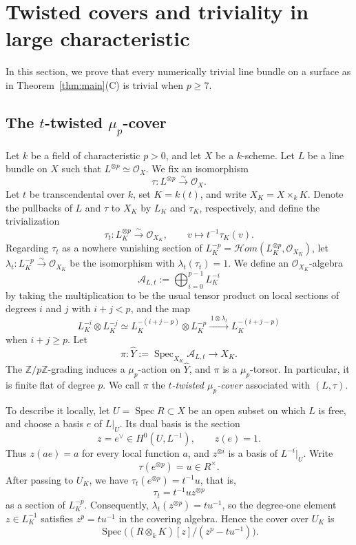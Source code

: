 \documentclass[10pt,abstract=true]{scrartcl}
\numberwithin{equation}{section}
\theoremstyle{definition}
\theoremstyle{remark}
\begin{document}
\section{Twisted covers and triviality in large characteristic}\label{sec:case-C-p-ge7}
In this section, we prove that every numerically trivial line bundle on a surface as in Theorem~\ref{thm:main}\textup{(C)} is trivial when $p\ge7$.

\subsection{The \texorpdfstring{$t$}{t}-twisted \texorpdfstring{$\mu_p$}{mu-p}-cover}\label{sec:generically-twisted-mu-p-cover}
Let $k$ be a field of characteristic $p>0$, and let $X$ be a $k$-scheme.
Let $L$ be a line bundle on $X$ such that $L^{\otimes p}\simeq\mathcal O_X$. We fix an isomorphism
\[
  \tau\colon L^{\otimes p}\xrightarrow{\sim}\mathcal O_X.
\]
Let $t$ be transcendental over $k$, set $K=k(t)$, and write
$X_K=X\times_k K$.  Denote the pullbacks of $L$ and $\tau$ to
$X_K$ by $L_K$ and $\tau_K$, respectively, and define the trivialization
\[
  \tau_t\colon L_K^{\otimes p}\xrightarrow{\sim}\mathcal O_{X_K},\qquad v\longmapsto t^{-1}\tau_K(v).
\]
Regarding $\tau_t$ as a nowhere vanishing section of $L_K^{-p}=\mathcal H\!om(L_K^{\otimes p},\mathcal O_{X_K})$, let $\lambda_t\colon L_K^{-p}\xrightarrow{\sim}\mathcal O_{X_K}$ be the isomorphism with $\lambda_t(\tau_t)=1$.
We define an $\mathcal O_{X_K}$-algebra
\[
  \mathcal A_{L,t}:=\bigoplus_{i=0}^{p-1}L_K^{-i}
\]
by taking the multiplication to be the usual tensor product on local sections of degrees $i$ and $j$ with $i+j<p$, and the map
\[
  L_K^{-i}\otimes L_K^{-j}
    \simeq
  L_K^{-(i+j-p)}\otimes L_K^{-p}
    \xrightarrow{\,1\otimes\lambda_t\,}
  L_K^{-(i+j-p)}
\]
when $i+j\geq p$.
Let
\[
  \pi\colon\widehat Y:=\operatorname{Spec}_{X_K}\mathcal A_{L,t}\longrightarrow X_K.
\]
The $\mathbb Z/p\mathbb Z$-grading induces a $\mu_p$-action on
$\widehat Y$, and $\pi$ is a $\mu_p$-torsor.  In
particular, it is finite flat of degree $p$.
We call $\pi$ the \emph{$t$-twisted $\mu_p$-cover} associated with $(L,\tau)$.

\smallskip
To describe it locally,
let $U=\operatorname{Spec}R\subset X$ be an open subset on which $L$
is free, and choose a basis $e$ of $L|_U$.  Its dual basis is the
section
\[
  z=e^\vee\in H^0(U,L^{-1}),\qquad z(e)=1.
\]
Thus $z(ae)=a$ for every local function $a$, and $z^{\otimes i}$ is a
basis of $L^{-i}|_U$.  Write
\[
  \tau(e^{\otimes p})=u\in R^\times.
\]
After passing to $U_K$, we have $\tau_t(e^{\otimes p})=t^{-1}u$, that is,
\[
  \tau_t=t^{-1}u z^{\otimes p}
\]
as a section of $L_K^{-p}$.
Consequently, $\lambda_t(z^{\otimes p})=tu^{-1}$, so the degree-one
element $z\in L_K^{-1}$ satisfies $z^p=tu^{-1}$ in the covering
algebra.  Hence the cover over $U_K$ is
\[
  \operatorname{Spec}
    \bigl((R\otimes_kK)[z]/(z^p-tu^{-1})\bigr).
\]
\end{document}
